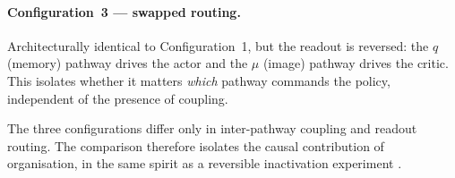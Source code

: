 \paragraph{Configuration~3 --- swapped routing.}
Architecturally identical to Configuration~1, but the readout is reversed: the $q$
(memory) pathway drives the actor and the $\mu$ (image) pathway drives the critic.
This isolates whether it matters \emph{which} pathway commands the policy,
independent of the presence of coupling.

The three configurations differ only in inter-pathway coupling and readout routing.
The comparison therefore isolates the causal contribution of organisation, in the
same spirit as a reversible inactivation experiment
\citep{wardak2006contribution, lovejoy2010inactivation}.
